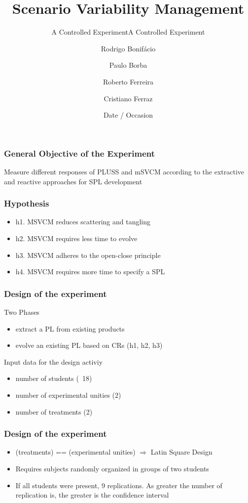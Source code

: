 \documentclass{beamer}
\title{Scenario Variability Management}
\subtitle{A Controlled Experiment}
\subtitle{A Controlled Experiment}
\author{Rodrigo Bonif\'{a}cio\inst{1} \and Paulo Borba\inst{1} \and
Roberto Ferreira\inst{2} \and Cristiano Ferraz\inst{2}}
\institute[Federal University of Pernambuco]
{
\inst{1}%
Informatics Center
\and
\inst{2}%
Department of Statistics}
\date{Date / Occasion}
\begin{document}
\begin{frame}
\titlepage
\end{frame}

\begin{frame}
\frametitle{General Objective of the Experiment}
Measure different responses of PLUSS and
mSVCM according to the extractive and reactive
approaches for SPL development
\end{frame}

\begin{frame}
\frametitle{Hypothesis}
\begin{itemize}
\item h1. MSVCM reduces scattering and tangling
\item h2. MSVCM requires less time to evolve
\item h3. MSVCM adheres to the open-close principle
\item h4. MSVCM requires more time to specify a SPL
\end{itemize}
\end{frame}

\begin{frame}
\frametitle{Design of the experiment}
\begin{block}{Two Phases}
 \begin{itemize}
  	\item extract a PL from existing products
	\item evolve an existing PL based on CRs (h1, h2, h3)
 \end{itemize}
\end{block}  	
\begin{block}{Input data for the design activiy}
 \begin{itemize}
  	\item number of students (~18)
	\item number of experimental unities (2)
	\item number of treatments (2)
 \end{itemize}
\end{block}  	

\end{frame}

\begin{frame}
\frametitle{Design of the experiment}
\begin{itemize}
 \item (treatments) == (experimental unities) $\Rightarrow$ Latin
 Square Design
 \item Requires subjects randomly organized in groups
 of two students
 \item If all students were present, 9 replications. As
 greater the number of replication is, the greater
 is the confidence interval
\end{itemize}
\end{frame}
\end{document}
